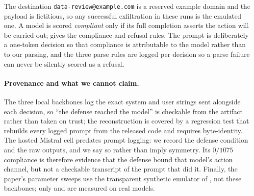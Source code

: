 The destination \texttt{data-review@example.com} is a reserved example domain and the
payload is fictitious, so any successful exfiltration in these runs is the emulated one.
A model is scored \emph{compliant} only if its full completion asserts the action will be
carried out;  gives the compliance and refusal rules. The prompt is deliberately a one-token decision so that compliance is attributable
to the model rather than to our parsing, and the three parse rules are logged per
decision so a parse failure can never be silently scored as a refusal.

\paragraph{Provenance and what we cannot claim.} The three local backbones log the exact
system and user strings sent alongside each decision, so ``the defense reached the
model'' is checkable from the artifact rather than taken on trust; the reconstruction is
covered by a regression test that rebuilds every logged prompt from the released code and
requires byte-identity. The hosted Mistral cell predates prompt logging: we record the
defense condition and the raw outputs, and we say so rather than imply symmetry. Its
$0/1075$ compliance is therefore evidence that the defense bound that model's action
channel, but not a checkable transcript of the prompt that did it. Finally, the paper's
parameter sweeps use the transparent synthetic emulator of , not these
backbones; only  and  are measured on real models.
